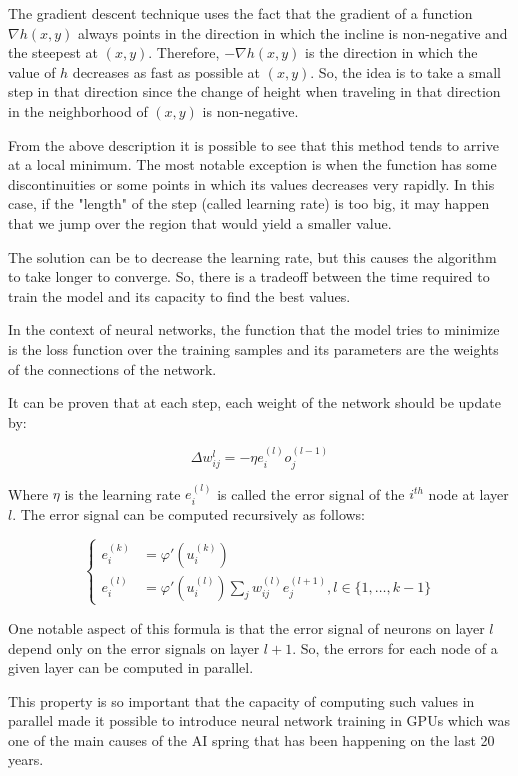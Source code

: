 The gradient descent technique uses the fact that the gradient of a function $\nabla h(x, y)$ always points in the direction in which the incline is non-negative and the steepest at $(x, y)$.
Therefore, $-\nabla h(x,y)$ is the direction in which the value of $h$ decreases as fast as possible at $(x, y)$.
So, the idea is to take a small step in that direction since the change of height when traveling in that direction in the neighborhood of $(x, y)$ is non-negative.

From the above description it is possible to see that this method tends to arrive at a local minimum.
The most notable exception is when the function has some discontinuities or some points in which its values decreases very rapidly.
In this case, if the "length" of the step (called learning rate) is too big, it may happen that we jump over the region that would yield a smaller value.

The solution can be to decrease the learning rate, but this causes the algorithm to take longer to converge.
So, there is a tradeoff between the time required to train the model and its capacity to find the best values.

In the context of neural networks, the function that the model tries to minimize is the loss function over the training samples and its parameters are the weights of the connections of the network.

It can be proven \cite{amari1993backpropagation} that at each step, each weight of the network should be update by:


$$
\Delta w_{ij}^{l} = -\eta e_i^{(l)} o_{j}^{(l-1)}
$$

Where $\eta$ is the learning rate $e_i^{(l)}$ is called the error signal of the $i^{th}$ node at layer $l$.
The error signal can be computed recursively as follows:

$$
\begin{cases}
    e_i^{(k)} &= \varphi '(u_i^{(k)}) \\
    e_i^{(l)} &= \varphi '(u_i^{(l)}) \sum_j w_{ij}^{(l)}e_j^{(l+1)}, l \in \{1,\dots,k-1\}
\end{cases}
$$

One notable aspect of this formula is that the error signal of neurons on layer $l$ depend only on the error signals on layer $l+1$.
So, the errors for each node of a given layer can be computed in parallel.

This property is so important that the capacity of computing such values in parallel made it possible to introduce neural network training in GPUs \cite{steinkraus2005using} which was one of the main causes of the AI spring that has been happening on the last 20 years.

